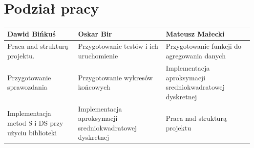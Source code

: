 \documentclass[10pt]{article}
\begin{document}
\section{Podział pracy}
\centering
\begin{tabular}{| p{4.4cm} | p{4.4cm} | p{4.4cm} |}
	\hline
	\textbf{Dawid Bińkuś} & \textbf{Oskar Bir} & \textbf{Mateusz Małecki} \\ \hline
	Praca nad strukturą projektu. & Przygotowanie testów i ich uruchomienie & Przygotowanie funkcji do agregowania danych \\ \hline
	Przygotowanie sprawozdania & Przygotowanie wykresów końcowych & Implementacja aproksymacji sredniokwadratowej dyskretnej\\ \hline
	Implementacja metod S i DS przy użyciu biblioteki & Implementacja aproksymacji sredniokwadratowej dyskretnej & Praca nad strukturą projektu \\ \hline	
	\end{tabular}
\end{document}
